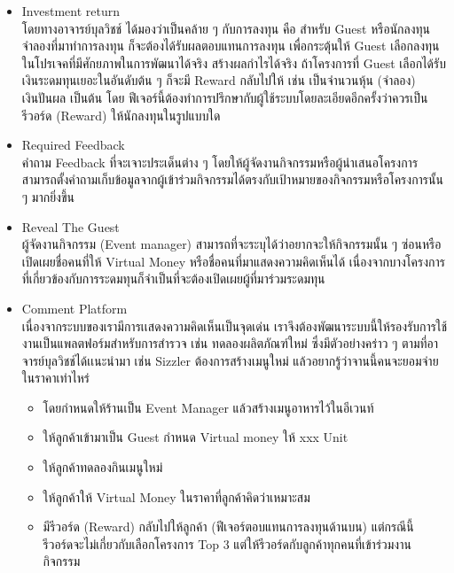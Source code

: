 \begin{itemize}
      \item Investment return \\
            โดยทางอาจารย์บุลวิชช์ ได้มองว่าเป็นคล้าย ๆ กับการลงทุน คือ สำหรับ Guest หรือนักลงทุนจำลองที่มาทำการลงทุน ก็จะต้องได้รับผลตอบแทนการลงทุน เพื่อกระตุ้นให้ Guest เลือกลงทุนในโปรเจคที่มีศักยภาพในการพัฒนาได้จริง สร้างผลกำไรได้จริง ถ้าโครงการที่ Guest เลือกได้รับเงินระดมทุนเยอะในอันดับต้น ๆ ก็จะมี Reward กลับไปให้ เช่น เป็นจำนวนหุ้น (จำลอง) เงินปันผล เป็นต้น
            โดย ฟีเจอร์นี้ต้องทำการปรึกษากับผู้ใช้ระบบโดยละเอียดอีกครั้งว่าควรเป็นรีวอร์ด (Reward) ให้นักลงทุนในรูปแบบใด
      \item Required Feedback \\
            คำถาม Feedback ที่จะเจาะประเด็นต่าง ๆ โดยให้ผู้จัดงานกิจกรรมหรือผู้นำเสนอโครงการสามารถตั้งคำถามเก็บข้อมูลจากผู้เข้าร่วมกิจกรรมได้ตรงกับเป้าหมายของกิจกรรมหรือโครงการนั้น ๆ มากยิ่งขึ้น
      \item Reveal The Guest \\
            ผู้จัดงานกิจกรรม (Event manager) สามารถที่จะระบุได้ว่าอยากจะให้กิจกรรมนั้น ๆ ซ่อนหรือเปิดเผยชื่อคนที่ให้ Virtual Money หรือชื่อคนที่มาแสดงความคิดเห็นได้ เนื่องจากบางโครงการที่เกี่ยวข้องกับการระดมทุนก็จำเป็นที่จะต้องเปิดเผยผู้ที่มาร่วมระดมทุน
      \item Comment Platform \\
            เนื่องจากระบบของเรามีการเเสดงความคิดเห็นเป็นจุดเด่น เราจึงต้องพัฒนาระบบนี้ให้รองรับการใช้งานเป็นแพลตฟอร์มสำหรับการสำรวจ เช่น ทดลองผลิตภัณฑ์ใหม่
            ซึ่งมีตัวอย่างคร่าว ๆ ตามที่อาจารย์บุลวิชช์ได้เเนะนำมา เช่น Sizzler ต้องการสร้างเมนูใหม่ แล้วอยากรู้ว่าจานนี้คนจะยอมจ่ายในราคาเท่าไหร่
            \begin{itemize}
                  \item โดยกำหนดให้ร้านเป็น Event Manager แล้วสร้างเมนูอาหารไว้ในอีเวนท์

                  \item ให้ลูกค้าเข้ามาเป็น Guest กำหนด Virtual money ให้ xxx Unit

                  \item ให้ลูกค้าทดลองกินเมนูใหม่

                  \item ให้ลูกค้าให้ Virtual Money ในราคาที่ลูกค้าคิดว่าเหมาะสม

                  \item มีรีวอร์ด (Reward) กลับไปให้ลูกค้า (ฟีเจอร์ตอบแทนการลงทุนด้านบน) แต่กรณีนี้ รีวอร์ดจะไม่เกี่ยวกับเลือกโครงการ Top 3 แต่ให้รีวอร์ดกับลูกค้าทุกคนที่เข้าร่วมงานกิจกรรม
            \end{itemize}
\end{itemize}